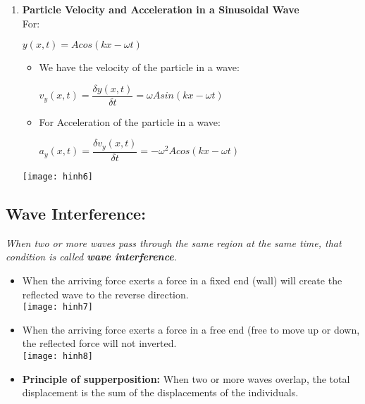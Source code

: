 \documentclass[10pt]{article}
\begin{document}
\begin{enumerate}
	\item \textbf{Particle Velocity and Acceleration in a Sinusoidal Wave} \\
	For: \\
	\begin{center}
		$y(x, t) = A cos(kx - \omega t)$
	\end{center}

	\begin{itemize}
		\item We have the velocity of the particle in a wave:
			\begin{center}
				$v_{y}(x, t) = \dfrac{\delta y(x, t)}{\delta t} =  \omega A sin(kx - \omega t)$
			\end{center}
		\item For Acceleration of the particle in a wave:
			\begin{center}
				$a_{y}(x, t) = \dfrac{\delta v_{y}(x, t)}{\delta t} = - \omega^{2} A cos(kx - \omega t)$
			\end{center}
	\end{itemize}

	\texttt{[image: hinh6]}
	\bigbreak
\end{enumerate}
\subsection{Wave Interference:}
\textit{When two or more waves pass through the same region at the same time, that condition is called \textbf{wave interference}.} \\

\begin{itemize}
	\item When the arriving force exerts a force in a fixed end (wall) will create the reflected wave to the reverse direction. \\
	\texttt{[image: hinh7]}
	\bigbreak
	\item When the arriving force exerts a force in a free end (free to move up or down, the reflected force will not inverted. \\
	\texttt{[image: hinh8]}
	\bigbreak
	\item \textbf{Principle of supperposition:} When two or more waves overlap, the total displacement is the sum of the displacements of the individuals.
\end{itemize} 
\end{document}
